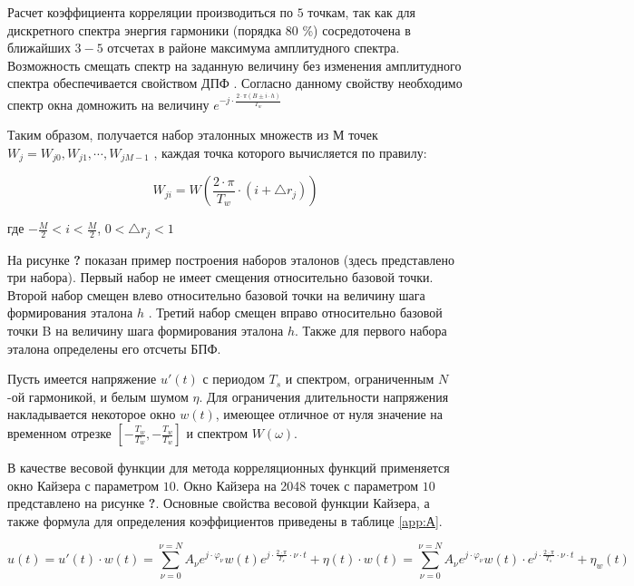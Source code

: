 Расчет коэффициента корреляции производиться по $5$ точкам, так как для дискретного спектра энергия гармоники (порядка $80$ \%) сосредоточена в ближайших $3-5$ отсчетах в районе максимума амплитудного спектра. Возможность смещать спектр на заданную величину без изменения амплитудного спектра обеспечивается свойством ДПФ \cite{sergienko2011digital}.
Согласно данному свойству необходимо спектр окна домножить на величину $e^{-j \cdot \frac{2 \cdot \pi (B \pm i \cdot h)}{T_w}}$

Таким образом, получается набор эталонных множеств из $М$  точек $W_j = {W_{j0}, W_{j1}, \cdots, W_{jM-1} }$ , каждая точка которого вычисляется по правилу:

\begin{equation}
	\label{eq:equation3.1}
W_{ji} = W \left( {\frac{2 \cdot \pi}{T_w} \cdot (i + \bigtriangleup r_j)}\right) 
\end{equation}

где $- \frac{M}{2} < i < \frac{M}{2}$, $0 < \bigtriangleup r_j < 1$

На рисунке \textbf{?} показан пример построения наборов эталонов (здесь представлено три набора). Первый набор не имеет смещения относительно базовой точки. Второй набор смещен влево относительно базовой точки на величину шага формирования эталона $h$  . Третий набор смещен вправо относительно базовой точки B на величину шага формирования эталона $h$. Также для первого набора эталона определены его отсчеты БПФ. 

Пусть имеется напряжение $u'(t)$ с периодом $T_s$ и спектром, ограниченным  $N$-ой гармоникой, и белым шумом $\eta$. Для ограничения длительности напряжения накладывается некоторое окно $w(t)$, имеющее отличное от нуля значение на временном отрезке $[- \frac{T_w}{T_w}, - \frac{T_w}{T_w}] $ и спектром $W(\omega)$. 

В качестве весовой функции для метода корреляционных функций применяется окно Кайзера с параметром $10$. Окно Кайзера на 2048 точек с параметром $10$ представлено на рисунке \textbf{?}. Основные свойства весовой функции Кайзера, а также формула для определения коэффициентов приведены в таблице \ref{app:А}.

\begin{equation}
	\label{eq:equation3.2}
	u(t) = u'(t) \cdot w(t) = \displaystyle\sum_{\nu=0}^{\nu=N} A_\nu e^{j \cdot \varphi_\nu} w(t) e^{j \cdot \frac{2 \cdot \pi}{T_s} \cdot \nu \cdot t} + \eta (t) \cdot w(t) = \displaystyle\sum_{\nu=0}^{\nu=N} A_\nu e^{j \cdot \varphi_\nu} w(t) \cdot e^{j \cdot \frac{2 \cdot \pi}{T_s} \cdot \nu \cdot t} +\eta_w(t)
\end{equation}

